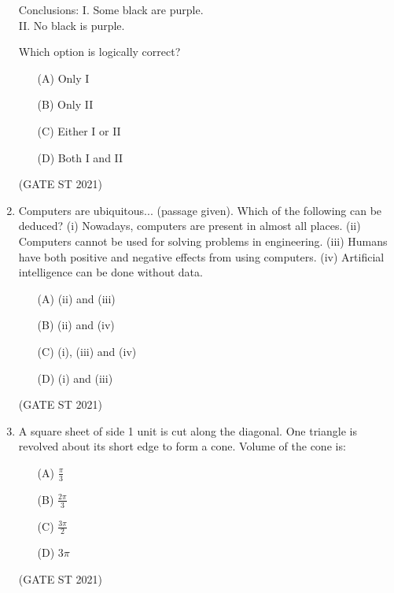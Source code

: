 \documentclass[journal,12pt,onecolumn]{IEEEtran}
\theoremstyle{remark}
\begin{document}
\begin{enumerate}
Conclusions: 
I. Some black are purple.  \\
II. No black is purple.

Which option is logically correct?
\begin{enumerate}
\item[(A)] Only I  
\item[(B)] Only II  
\item[(C)] Either I or II  
\item[(D)] Both I and II
\end{enumerate}

\hfill (GATE ST 2021)\\
\item
Computers are ubiquitous... (passage given).  
Which of the following can be deduced?  
(i) Nowadays, computers are present in almost all places.  
(ii) Computers cannot be used for solving problems in engineering.  
(iii) Humans have both positive and negative effects from using computers.  
(iv) Artificial intelligence can be done without data.

\begin{enumerate}
\item[(A)] (ii) and (iii)
\item[(B)] (ii) and (iv)
\item[(C)] (i), (iii) and (iv)
\item[(D)] (i) and (iii)
\end{enumerate}

\hfill (GATE ST 2021)\\

\item
A square sheet of side 1 unit is cut along the diagonal.  
One triangle is revolved about its short edge to form a cone.  
Volume of the cone is:

\begin{enumerate}
\item[(A)] $\frac{\pi}{3}$
\item[(B)] $\frac{2\pi}{3}$
\item[(C)] $\frac{3\pi}{2}$
\item[(D)] $3\pi$
\end{enumerate}
\hfill (GATE ST 2021)\\





\end{enumerate}
\end{document}
